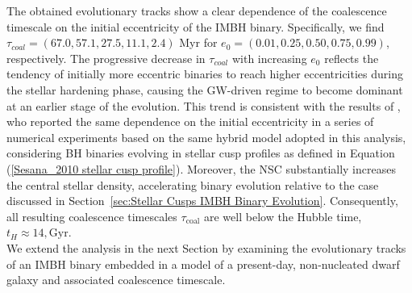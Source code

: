 \documentclass[12pt,twoside,openany]{book}
\begin{document}
The obtained evolutionary tracks show a clear dependence of the coalescence timescale on the initial eccentricity of the IMBH binary. Specifically, we find $\tau_{coal}=(67.0, 57.1, 27.5, 11.1, 2.4)$ Myr for $e_0=(0.01,0.25,0.50,0.75,0.99)$, respectively. The progressive decrease in $\tau_{coal}$ with increasing $e_0$ reflects the tendency of initially more eccentric binaries to reach higher eccentricities during the stellar hardening phase, causing the GW-driven regime to become dominant at an earlier stage of the evolution. This trend is consistent with the results of \textcite{Sesana_2010}, who reported the same dependence on the initial eccentricity in a series of numerical experiments based on the same hybrid model adopted in this analysis, considering BH binaries evolving in stellar cusp profiles as defined in Equation (\ref{Sesana_2010 stellar cusp profile}). Moreover, the NSC substantially increases the central stellar density, accelerating binary evolution relative to the case discussed in Section~\ref{sec:Stellar Cusps IMBH Binary Evolution}. Consequently, all resulting coalescence timescales $\tau_{\mathrm{coal}}$ are well below the Hubble time, $t_H\approx14,\mathrm{Gyr}$.\\We extend the analysis in the next Section by examining the evolutionary tracks of an IMBH binary embedded in a model of a present-day, non-nucleated dwarf galaxy and associated coalescence timescale.
\end{document}
